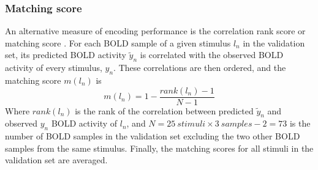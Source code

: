 \subsubsection*{Matching score}
%
An alternative measure of encoding performance is the correlation rank score or matching score \citep{SF14}. For each BOLD sample of a given stimulus $l_{n}$ in the validation set, its predicted BOLD activity $\widetilde{y}_{n}$ is correlated with the observed BOLD activity of every stimulus, $y_{n}$.
These correlations are then ordered, and the  matching score $m(l_{n})$ is \[m(l_{n}) = 1-\frac{rank(l_{n})-1}{N-1} \] Where $rank(l_{n})$ is the rank of the correlation between predicted $\widetilde{y}_{n}$ and observed $y_{n}$ BOLD activity of $l_{n}$, and $N = 25 \: stimuli \times 3 \: samples - 2 = 73$ is the number of BOLD samples in the validation set excluding the two other BOLD samples from the same stimulus.
Finally, the matching scores for all stimuli in the validation set are averaged.

